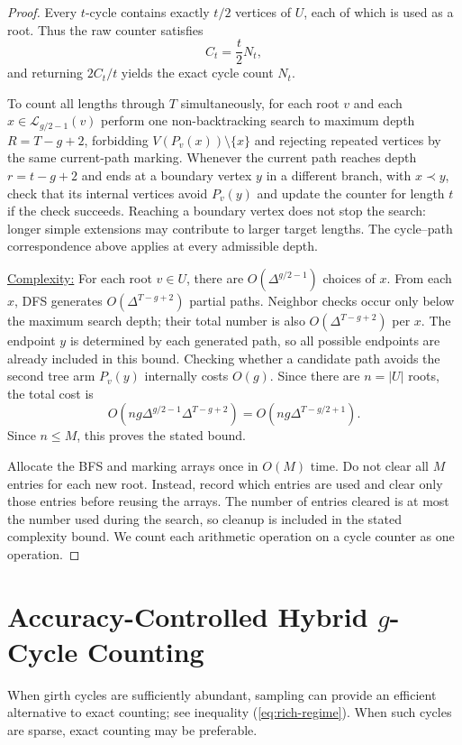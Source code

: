 \documentclass[conference]{IEEEtran}
\newcommand{\cL}{\mathcal{L}}
\begin{document}
\begin{proof}
Every $t$-cycle contains exactly $t/2$ vertices of $U$, each of which
is used as a root. Thus the raw counter satisfies
\[
C_t=\frac{t}{2}N_t,
\]
and returning $2C_t/t$ yields the exact cycle count $N_t$.

To count all lengths through $T$ simultaneously, for each root $v$ and each
$x\in\cL_{g/2-1}(v)$ perform one non-backtracking search to maximum depth
$R=T-g+2$, forbidding $V(P_v(x))\setminus\{x\}$ and rejecting repeated
vertices by the same current-path marking. Whenever the current path
reaches depth $r=t-g+2$ and ends at a boundary vertex $y$ in a different
branch, with $x\prec y$, check that its internal vertices avoid $P_v(y)$
and update the counter for length $t$ if the check succeeds. Reaching a boundary
vertex does not stop the search: longer simple extensions may contribute
to larger target lengths. The cycle--path correspondence above applies
at every admissible depth.

\underline{Complexity:}
For each root $v\in U$, there are $O(\Delta^{g/2-1})$ choices of $x$.
From each $x$, DFS generates $O(\Delta^{T-g+2})$ partial paths.
Neighbor checks occur only below the maximum search depth;
their total number is also $O(\Delta^{T-g+2})$ per $x$.
The endpoint $y$ is determined by each generated path, so all possible
endpoints are already included in this bound. Checking whether a
candidate path avoids the second tree arm $P_v(y)$ internally costs
$O(g)$. Since there are $n=|U|$ roots, the total cost is
\[
O\!\left(ng\Delta^{g/2-1}\Delta^{T-g+2}\right)
=
O\!\left(ng\Delta^{T-g/2+1}\right).
\]
Since $n\le M$, this proves the stated bound.

Allocate the BFS and marking arrays once in $O(M)$ time.
Do not clear all $M$ entries for each new root. Instead, record which
entries are used and clear only those entries before reusing the arrays.
The number of entries cleared is at most the number used during the
search, so cleanup is included in the stated complexity bound.
We count each arithmetic operation on a cycle counter as one operation.
\end{proof}

\section{Accuracy-Controlled Hybrid $g$-Cycle Counting}
\label{sec:random}

When girth cycles are sufficiently abundant, sampling
can provide an efficient alternative to exact counting; see inequality (\ref{eq:rich-regime}).
When such cycles are sparse, exact counting may be preferable.
\end{document}
